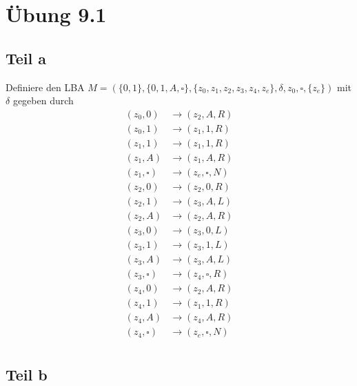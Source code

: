 \documentclass[10pt,a4paper]{article}
\begin{document}
\section{Übung 9.1}

\subsection{Teil a}

Definiere den LBA $M = (\{ 0, 1 \}, \{ 0, 1, A, \square \}, \{ z_{0}, z_{1}, z_{2}, z_{3}, z_{4}, z_{e} \}, \delta, z_{0}, \square, \{ z_{e} \})$ mit $\delta$ gegeben durch
\begin{align*}
  (z_{0}, 0) & \rightarrow (z_{2}, A, R)\\
  (z_{0}, 1) & \rightarrow (z_{1}, 1, R)\\
  (z_{1}, 1) & \rightarrow (z_{1}, 1, R)\\
  (z_{1}, A) & \rightarrow (z_{1}, A, R)\\
  (z_{1}, \square) & \rightarrow (z_{e}, \square, N)\\
  (z_{2}, 0) & \rightarrow (z_{2}, 0, R)\\
  (z_{2}, 1) & \rightarrow (z_{3}, A, L)\\
  (z_{2}, A) & \rightarrow (z_{2}, A, R)\\
  (z_{3}, 0) & \rightarrow (z_{3}, 0, L)\\
  (z_{3}, 1) & \rightarrow (z_{3}, 1, L)\\
  (z_{3}, A) & \rightarrow (z_{3}, A, L)\\
  (z_{3}, \square) & \rightarrow (z_{4}, \square, R)\\
  (z_{4}, 0) & \rightarrow (z_{2}, A, R)\\
  (z_{4}, 1) & \rightarrow (z_{1}, 1, R)\\
  (z_{4}, A) & \rightarrow (z_{4}, A, R)\\
  (z_{4}, \square) & \rightarrow (z_{e}, \square, N)\\
\end{align*}

\subsection{Teil b}
\end{document}
